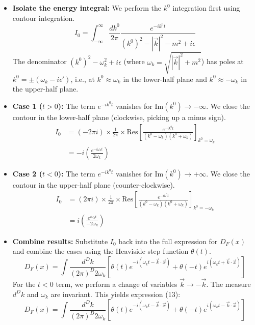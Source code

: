 \documentclass[11pt, a4paper]{article}
\begin{document}
\begin{itemize}
    \item \textbf{Isolate the energy integral:} We perform the $k^0$ integration first using contour integration.
    \[ I_0 = \int_{-\infty}^{\infty} \frac{dk^0}{2\pi} \frac{e^{-ik^0 t}}{(k^0)^2 - |\vec{k}|^2 - m^2 + i\epsilon} \]
    The denominator $(k^0)^2 - \omega_k^2 + i\epsilon$ (where $\omega_k = \sqrt{|\vec{k}|^2 + m^2}$) has poles at $k^0 = \pm(\omega_k - i\epsilon')$, i.e., at $k^0 \approx \omega_k$ in the lower-half plane and $k^0 \approx -\omega_k$ in the upper-half plane.

    \item \textbf{Case 1 ($t>0$):} The term $e^{-ik^0 t}$ vanishes for $\text{Im}(k^0) \to -\infty$. We close the contour in the lower-half plane (clockwise, picking up a minus sign).
    \begin{align*}
        I_0 &= (-2\pi i) \times \frac{1}{2\pi} \times \text{Res}\left[\frac{e^{-ik^0 t}}{(k^0-\omega_k)(k^0+\omega_k)}\right]_{k^0=\omega_k} \\
            &= -i \left( \frac{e^{-i\omega_k t}}{2\omega_k} \right)
    \end{align*}

    \item \textbf{Case 2 ($t<0$):} The term $e^{-ik^0 t}$ vanishes for $\text{Im}(k^0) \to +\infty$. We close the contour in the upper-half plane (counter-clockwise).
    \begin{align*}
        I_0 &= (2\pi i) \times \frac{1}{2\pi} \times \text{Res}\left[\frac{e^{-ik^0 t}}{(k^0-\omega_k)(k^0+\omega_k)}\right]_{k^0=-\omega_k} \\
            &= i \left( \frac{e^{i\omega_k t}}{-2\omega_k} \right)
    \end{align*}

    \item \textbf{Combine results:} Substitute $I_0$ back into the full expression for $D_F(x)$ and combine the cases using the Heaviside step function $\theta(t)$.
    \[ D_F(x) = \int \frac{d^Dk}{(2\pi)^D 2\omega_k} \left[ \theta(t)e^{-i(\omega_k t - \vec{k}\cdot\vec{x})} + \theta(-t)e^{i(\omega_k t + \vec{k}\cdot\vec{x})} \right] \]
    For the $t<0$ term, we perform a change of variables $\vec{k} \to -\vec{k}$. The measure $d^Dk$ and $\omega_k$ are invariant. This yields expression (13):
    \[ D_F(x) = \int \frac{d^Dk}{(2\pi)^D 2\omega_k} \left[ \theta(t)e^{-i(\omega_k t - \vec{k}\cdot\vec{x})} + \theta(-t)e^{i(\omega_k t - \vec{k}\cdot\vec{x})} \right] \]
\end{itemize}
\end{document}
